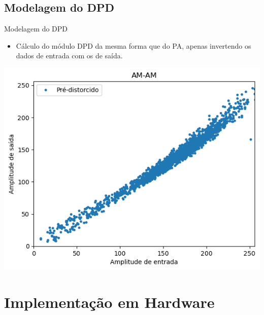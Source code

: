 \documentclass{if-beamer}
\begin{document}
\subsection{Modelagem do DPD}
\begin{frame}{Modelagem do DPD}
	\begin{minipage}{0.5\textwidth}
		\begin{itemize}
			\item Cálculo do módulo DPD da mesma forma que do PA, apenas invertendo os dados de entrada com os de saída.
		\end{itemize}
		
		
	\end{minipage}%
	\hspace{0.04\textwidth}
	\begin{minipage}{0.5\textwidth}
		\includegraphics[scale=0.40]{modelodpd.png}
	\end{minipage}
\end{frame}
\section{Implementação em Hardware}
\end{document}
